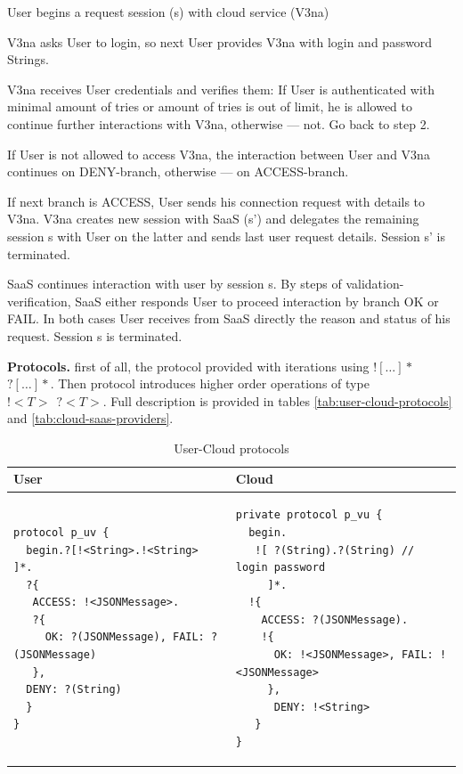 \begin{compactenum}
\item  User begins a request session (s) with cloud service (V3na)

\item  V3na asks User to login, so next User provides V3na with login and password Strings.

\item  V3na receives User credentials and verifies them: If User is authenticated with minimal amount of tries or amount of tries is out of limit, he is allowed to continue further interactions with V3na, otherwise --- not. Go back to step 2.

\item  If User is not allowed to access V3na, the interaction between User and V3na continues on DENY-branch, otherwise --- on ACCESS-branch.

\item  If next branch is ACCESS, User sends his connection request with details to V3na. V3na creates new session with SaaS (s') and delegates the remaining session s with User on the latter and sends last user request details. Session s' is terminated.

\item  SaaS continues interaction with user by session s. By steps of validation-verification, SaaS either responds User to proceed interaction by branch OK or FAIL. In both cases User receives from SaaS directly the reason and status of his request. Session s is terminated.
\end{compactenum}

\textbf{Protocols.} first of all, the protocol provided with iterations using $![\dots]*$ $?[\dots]*$. Then protocol introduces higher order operations of type $!<T>\ \ ?<T>$. Full description is provided in tables \ref{tab:user-cloud-protocols} and \ref{tab:cloud-saas-providers}.

{
\lstset{
framerule=0pt,
numbers=none
}
\begin{longtable}{|p{}|p{}|}
\caption{User-Cloud protocols}\label{tab:user-cloud-protocol} \\ \hline
\textbf{User} & \textbf{Cloud} \\ \hline \endhead
\begin{lstlisting}
protocol p_uv { 
  begin.?[!<String>.!<String> ]*.
  ?{
   ACCESS: !<JSONMessage>.
   ?{
     OK: ?(JSONMessage), FAIL: ?(JSONMessage)
   },
  DENY: ?(String)
  } 
}
\end{lstlisting}
&
\begin{lstlisting}
private protocol p_vu { 
  begin.
   ![ ?(String).?(String) // login password
     ]*.
  !{
    ACCESS: ?(JSONMessage).
    !{
      OK: !<JSONMessage>, FAIL: !<JSONMessage>
     },
      DENY: !<String>
   } 
}
\end{lstlisting}
\\ \hline
\end{longtable}
}


